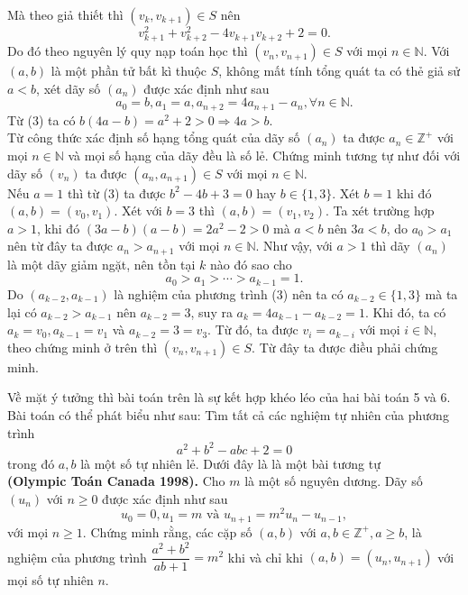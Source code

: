 \begin{bt}[VMO 2012]
{		Mà theo giả thiết thì $(v_k,v_{k+1})\in S$ nên 
		\[v_{k+1}^2+v_{k+2}^2-4v_{k+1}v_{k+2}+2=0.\]
		Do đó theo nguyên lý quy nạp toán học thì $(v_n,v_{n+1})\in S$ với mọi $n\in\mathbb{N}$. Với $(a,b)$ là một phần tử bất kì thuộc $S$, không mất tính tổng quát ta có thẻ giả sử $a<b$, xét dãy số $(a_n)$ được xác định như sau
		\[a_0=b, a_1=a, a_{n+2}=4a_{n+1}-a_n, \forall n\in \mathbb{N}. \]
		Từ (3) ta có $b(4a-b)=a^2+2>0\Rightarrow 4a>b.$\\
		Từ công thức xác định số hạng tổng quát của dãy số $(a_n)$ ta được $a_n \in \mathbb{Z}^+$ với mọi $n\in \mathbb{N}$ và mọi số hạng của dãy đều là số lẻ. Chứng minh tương tự như đối với dãy số $(v_n)$ ta được $(a_n,a_{n+1})\in S$ với mọi $n\in \mathbb{N}$.\\
		Nếu $a=1$ thì từ (3) ta được $b^2-4b+3=0$ hay $b\in \{1,3\}$. Xét $b=1$ khi đó $(a,b)=(v_0,v_1)$. Xét với $b=3$ thì $(a,b)=(v_1,v_2)$. Ta xét trường hợp $a>1$, khi đó $(3a-b)(a-b)=2a^2-2>0$ mà $a<b$ nên $3a<b$, do $a_0>a_1$ nên từ đây ta được $a_n>a_{n+1}$ với mọi $n\in \mathbb{N}$. Như vậy, với $a>1$ thì dãy $(a_n)$ là một dãy giảm ngặt, nên tồn tại $k$ nào đó sao cho
		\[a_0>a_1>\cdots >a_{k-1}=1. \]
		Do $(a_{k-2},a_{k-1})$ là nghiệm của phương trình (3) nên ta có $a_{k-2}\in \{1,3\}$ mà ta lại có $a_{k-2}>a_{k-1}$ nên $a_{k-2}=3$, suy ra $a_k=4a_{k-1}-a_{k-2}=1$. Khi đó, ta có $a_k=v_0, a_{k-1}=v_1$ và $a_{k-2}=3=v_3$. Từ đó, ta được $v_i=a_{k-i}$ với mọi $i\in \mathbb{N}$, theo chứng minh ở trên thì $(v_n,v_{n+1})\in S$. Từ đây ta được điều phải chứng minh.
	}
	\begin{nx}
		Về mặt ý tưởng thì bài toán trên là sự kết hợp khéo léo của hai bài toán 5 và 6. Bài toán có thể phát biểu như sau: Tìm tất cả các nghiệm tự nhiên của phương trình 
		\[a^2+b^2-abc+2=0\]
		trong đó $a,b$ là một số tự nhiên lẻ. Dưới đây là là một bài tương tự\\
		\textbf{(Olympic Toán Canada 1998).} Cho $m$ là một số nguyên dương. Dãy số $(u_n)$ với $n\geq 0$ được xác định như sau
		\[u_0=0, u_1=m \text{ và } u_{n+1}=m^2u_n-u_{n-1}, \]
		với mọi $n\geq 1$. Chứng minh rằng, các cặp số $(a,b)$ với $a,b\in \mathbb{Z}^+, a\geq b$, là nghiệm của phương trình $\dfrac{a^2+b^2}{ab+1}=m^2$ khi và chỉ khi $(a,b)=(u_n,u_{n+1})$ với mọi số tự nhiên $n$.
	\end{nx}
	
\end{bt} 

